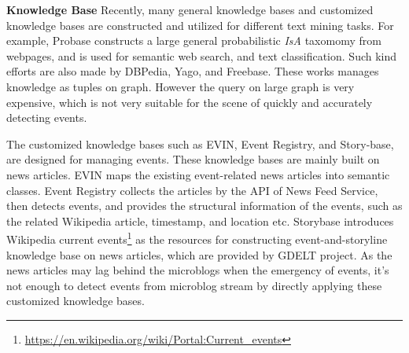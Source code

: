 \documentclass[runningheads,a4paper]{llncs}
\begin{document}
\textbf{Knowledge Base} Recently, many general knowledge bases and customized knowledge bases are constructed and utilized for different text mining tasks. 
For example, Probase\cite{wu2012probase} constructs a large general probabilistic \textit{IsA} taxomomy from webpages, and is used for semantic web search, and text classification\cite{wang2014concept}.
Such kind efforts are also made by DBPedia\cite{auer2007dbpedia}, Yago\cite{fabian2007yago}, and Freebase\cite{bollacker2008freebase}. 
These works manages knowledge as tuples on graph. 
However the query on large graph is very expensive\cite{huang2011scalable}, which is not very suitable for the scene of quickly and accurately detecting events.

The customized knowledge bases such as EVIN\cite{kuzey2014evin}, Event Registry\cite{leban2014eventRegistry}, and Story-base\cite{wu2015storybase}, are designed for managing events.
These knowledge bases are mainly built on news articles.
EVIN maps the existing event-related news articles into semantic classes. 
Event Registry collects the articles by the API of News Feed Service\cite{trampuvs2012newsfeed}, then detects events, and provides the structural information of the events, such as the related Wikipedia article, timestamp, and location etc. 
Storybase introduces Wikipedia current events\footnote{\url{https://en.wikipedia.org/wiki/Portal:Current_events}} as the resources for constructing event-and-storyline knowledge base on news articles, which are provided by GDELT project\cite{leetaru2013gdelt}.
As the news articles may lag behind the microblogs when the emergency of events, it's not enough to detect events from microblog stream by directly applying these customized knowledge bases. 









\end{document}
